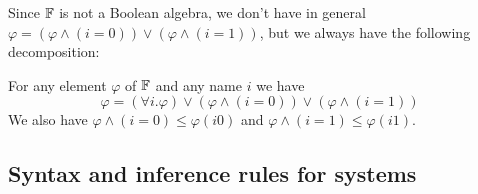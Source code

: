 Since $\mathbb{F}$ is not a Boolean algebra, we don't have in general
$\varphi = (\varphi \wedge (i=0)) \vee (\varphi \wedge (i=1))$, but we
always have the following decomposition:

\begin{lemma}\label{decomp}
  For any element $\varphi$ of $\mathbb{F}$ and any name $i$ we have
  \[
  \varphi = (\forall i. \varphi) \vee (\varphi \wedge (i=0)) \vee (\varphi \wedge  (i=1))
  \]
  We also have $\varphi\wedge (i=0)\leqslant \varphi(i0)$
and  $\varphi\wedge (i=1)\leqslant \varphi(i1)$.
%
\end{lemma}


\subsection{Syntax and inference rules for systems}

